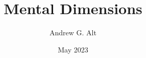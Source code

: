 \documentclass[12pt,openright,draft,titlepage]{bookmod}
\begin{document}
%
\sloppy

\author{Andrew G. Alt}
\title{Mental Dimensions}
\date{May 2023}

\frontmatter


\clearpage\thispagestyle{plain}
\thispagestyle{empty}
\hfill

\clearpage\thispagestyle{plain}
\thispagestyle{empty}
\hfill





\end{document}
